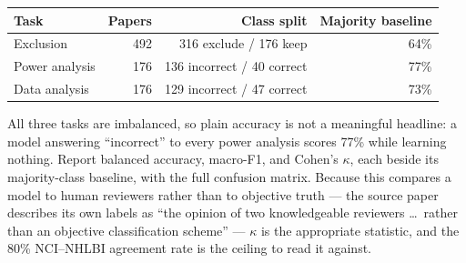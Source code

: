 \documentclass[11pt]{article}
\begin{document}
\begin{table}[h]
\centering
\begin{tabular}{lrrr}
\toprule
\textbf{Task} & \textbf{Papers} & \textbf{Class split} & \textbf{Majority baseline} \\
\midrule
Exclusion      & 492 & 316 exclude / 176 keep     & 64\% \\
Power analysis & 176 & 136 incorrect / 40 correct & 77\% \\
Data analysis  & 176 & 129 incorrect / 47 correct & 73\% \\
\bottomrule
\end{tabular}
\end{table}

\noindent
All three tasks are imbalanced, so plain accuracy is not a meaningful headline: a model answering
``incorrect'' to every power analysis scores 77\% while learning nothing. Report balanced accuracy,
macro-F1, and Cohen's $\kappa$, each beside its majority-class baseline, with the full confusion
matrix. Because this compares a model to human reviewers rather than to objective truth --- the source
paper describes its own labels as ``the opinion of two knowledgeable reviewers \dots\ rather than an
objective classification scheme'' --- $\kappa$ is the appropriate statistic, and the 80\% NCI--NHLBI
agreement rate is the ceiling to read it against.
\end{document}
